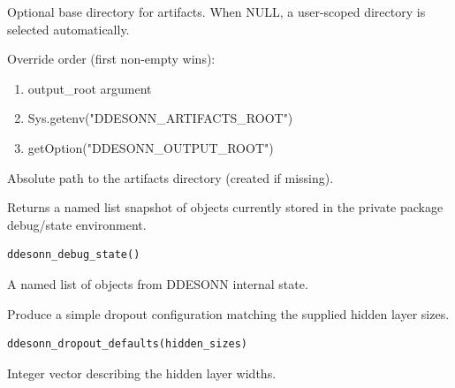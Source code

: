 \documentclass[a4paper]{book}
\begin{document}
%
\begin{Arguments}
\begin{ldescription}
\item[\code{output\_root}] Optional base directory for artifacts. When NULL, a
user-scoped directory is selected automatically.
\end{ldescription}
\end{Arguments}
%
\begin{Details}
Override order (first non-empty wins):
\begin{enumerate}

\item{} output\_root argument
\item{} Sys.getenv("DDESONN\_ARTIFACTS\_ROOT")
\item{} getOption("DDESONN\_OUTPUT\_ROOT")

\end{enumerate}

\end{Details}
%
\begin{Value}
Absolute path to the artifacts directory (created if missing).
\end{Value}
%
\begin{Description}
Returns a named list snapshot of objects currently stored in the private package debug/state environment.
\end{Description}
%
\begin{Usage}
\begin{verbatim}
ddesonn_debug_state()
\end{verbatim}
\end{Usage}
%
\begin{Value}
A named list of objects from DDESONN internal state.
\end{Value}
%
\begin{Description}
Produce a simple dropout configuration matching the supplied
hidden layer sizes.
\end{Description}
%
\begin{Usage}
\begin{verbatim}
ddesonn_dropout_defaults(hidden_sizes)
\end{verbatim}
\end{Usage}
%
\begin{Arguments}
\begin{ldescription}
\item[\code{hidden\_sizes}] Integer vector describing the hidden layer widths.
\end{ldescription}
\end{Arguments}
\end{document}
